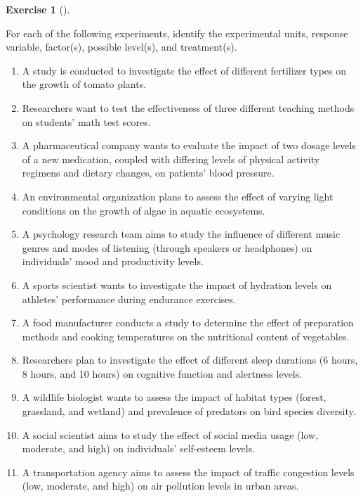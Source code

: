 \documentclass[
  letterpaper,
  DIV=11,
  numbers=noendperiod]{scrreprt}
\providecommand{\tightlist}{%
  \setlength{\itemsep}{0pt}\setlength{\parskip}{0pt}}\usepackage{longtable,booktabs,array}
\theoremstyle{definition}
\newtheorem{exercise}{Exercise}[chapter]
\theoremstyle{definition}
\theoremstyle{definition}
\theoremstyle{remark}
\begin{document}
\begin{exercise}[]\protect\hypertarget{exr-10.17}{}\label{exr-10.17}

For each of the following experiments, identify the experimental units,
response variable, factor(s), possible level(s), and treatment(s).

\begin{enumerate}
\def\labelenumi{\alph{enumi}.}
\tightlist
\item
  A study is conducted to investigate the effect of different fertilizer
  types on the growth of tomato plants.
\item
  Researchers want to test the effectiveness of three different teaching
  methods on students' math test scores.
\item
  A pharmaceutical company wants to evaluate the impact of two dosage
  levels of a new medication, coupled with differing levels of physical
  activity regimens and dietary changes, on patients' blood pressure.
\item
  An environmental organization plans to assess the effect of varying
  light conditions on the growth of algae in aquatic ecosystems.
\item
  A psychology research team aims to study the influence of different
  music genres and modes of listening (through speakers or headphones)
  on individuals' mood and productivity levels.
\item
  A sports scientist wants to investigate the impact of hydration levels
  on athletes' performance during endurance exercises.
\item
  A food manufacturer conducts a study to determine the effect of
  preparation methods and cooking temperatures on the nutritional
  content of vegetables.
\item
  Researchers plan to investigate the effect of different sleep
  durations (6 hours, 8 hours, and 10 hours) on cognitive function and
  alertness levels.
\item
  A wildlife biologist wants to assess the impact of habitat types
  (forest, grassland, and wetland) and prevalence of predators on bird
  species diversity.
\item
  A social scientist aims to study the effect of social media usage
  (low, moderate, and high) on individuals' self-esteem levels.
\item
  A transportation agency aims to assess the impact of traffic
  congestion levels (low, moderate, and high) on air pollution levels in
  urban areas.
\end{enumerate}

\end{exercise}
\end{document}
